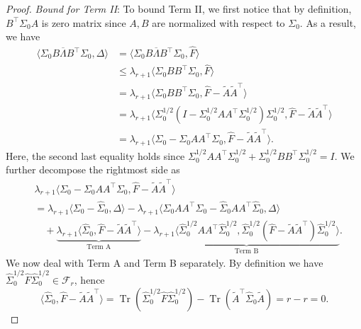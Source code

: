 \documentclass[11pt]{article}
\newcommand{\LambdaRest}{\overline{\Lambda}} %
\newcommand{\so}{\widehat{\Sigma}_0}
\DeclareMathOperator{\Tr}{Tr}
\newcommand{\0}{{\mathbf{0}}}
\newcommand{\tA}{{\widetilde{A}}}
\begin{document}
\begin{proof}
\textit{Bound for Term II}: 
To bound Term II, we first notice that by definition, $B^\top\Sigma_0A$ is zero matrix since $A,B$ are normalized with respect to $\Sigma_0$. As a result, we have 
\begin{align*}
\langle \Sigma_0B\LambdaRest B^\top\Sigma_0,\Delta\rangle
& =\langle\Sigma_0B\LambdaRest B^\top\Sigma_0,\widehat{F}  \rangle \\
& \leq \lambda_{r+1}\langle\Sigma_0B B^\top\Sigma_0,\widehat{F}  \rangle \\
& =\lambda_{r+1}\langle \Sigma_0BB^\top\Sigma_0,\widehat{F}-\tA\tA^\top\rangle
\\
& =\lambda_{r+1}\langle \Sigma_0^{1/2}(I-\Sigma_0^{1/2}AA^\top\Sigma_0^{1/2})\Sigma_0^{1/2},\widehat{F}-\tA\tA^\top\rangle\\
& = 
\lambda_{r+1}\langle \Sigma_0-\Sigma_0AA^\top\Sigma_0,  \widehat{F}-\tA\tA^\top\rangle
.
\end{align*}
Here, the second last equality holds since $\Sigma_0^{1/2}AA^\top\Sigma_0^{1/2} + \Sigma_0^{1/2}BB^\top\Sigma_0^{1/2} = I$.
We further decompose the rightmost side as
\begin{align*}
& \lambda_{r+1}\langle \Sigma_0-\Sigma_0AA^\top\Sigma_0,  \widehat{F}-\tA\tA^\top\rangle \\
& = \lambda_{r+1}\langle \Sigma_0-\widehat{\Sigma}_0,\Delta\rangle -\lambda_{r+1}\langle\Sigma_0AA^\top\Sigma_0-\widehat{\Sigma}_0AA^\top\so,\Delta \rangle \\
&\quad +\underbrace{\lambda_{r+1}\langle \so, \widehat{F}-\tA\tA^\top \rangle}_{\text{Term A}}-\underbrace{\lambda_{r+1}\langle\so^{1/2}AA^\top\so^{1/2},\so^{1/2}(\widehat{F}-\tA\tA^\top)\so^{1/2}\rangle}_{\text{Term B}}.
\end{align*} 
We now deal with Term A and Term B separately. By definition we have $\so^{1/2}\widehat{F}\so^{1/2}\in\mathcal{F}_r$, hence\begin{equation*}
\langle \so, \widehat{F}-\tA\tA^\top \rangle=\Tr(\so^{1/2}\widehat{F}\so^{1/2})-\Tr(\tA^\top\so\tA)=r-r=0.
\end{equation*}

\end{proof}
\end{document}
